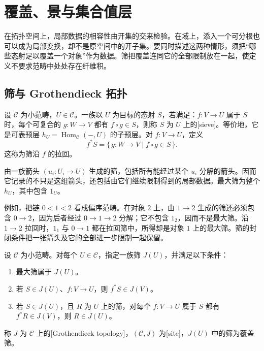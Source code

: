 
\section{覆盖、景与集合值层}
\label{b4:sec:E01}

在拓扑空间上，局部数据的相容性由开集的交来检验。在域上，添入一个可分根也可以成为局部变换，却不是原空间中的开子集。要同时描述这两种情形，须把“哪些态射足以覆盖一个对象”作为数据。筛把覆盖连同它的全部限制放在一起，使定义不要求范畴中处处存在纤维积。

\subsection{筛与 Grothendieck 拓扑}
\label{b4:subsec:E01:01}

\begin{definition}\label{b4:def:sieve}
	设 \(\mathcal C\) 为小范畴，\(U\in\mathcal C\)。一族以 \(U\) 为目标的态射 \(S\)，若满足：\(f:V\to U\) 属于 \(S\) 时，每个可复合的 \(g:W\to V\) 都有 \(f\circ g\in S\)，则称 \(S\) 为 \(U\) 上的[sieve]。等价地，它是可表预层 \(h_U=\operatorname{Hom}_{\mathcal C}(-,U)\) 的子预层。对 \(f:V\to U\)，定义
	\[
		f^*S=\{\,g:W\to V\mid f\circ g\in S\,\}.
	\]
	这称为筛沿 \(f\) 的拉回。
\end{definition}

由一族箭头 \((u_i:U_i\to U)\) 生成的筛，包括所有能经过某个 \(u_i\) 分解的箭头。因而它记录的不只是这组箭头，还包括由它们继续限制得到的局部数据。最大筛为整个 \(h_U\)，其中包含 \(1_U\)。

\ProseParagraphBreak
例如，把链 \(0<1<2\) 看成偏序范畴。在对象 \(2\) 上，由 \(1\to2\) 生成的筛还必须包含 \(0\to2\)，因为后者经过 \(0\to1\to2\) 分解；它不包含 \(1_2\)，因而不是最大筛。沿 \(1\to2\) 拉回时，\(1_1\) 与 \(0\to1\) 都在拉回筛中，所得却是对象 \(1\) 上的最大筛。筛的封闭条件把一张箭头及它的全部进一步限制一起保留。

\begin{definition}\label{b4:def:grothendieck-site}
	设 \(\mathcal C\) 为小范畴。对每个 \(U\in\mathcal C\)，指定一族筛 \(J(U)\)，并满足以下条件：
	\begin{enumerate}
		\item 最大筛属于 \(J(U)\)。
		\item 若 \(S\in J(U)\)、\(f:V\to U\)，则 \(f^*S\in J(V)\)。
		\item 若 \(S\in J(U)\)，且 \(R\) 为 \(U\) 上的筛，对每个 \(f:V\to U\) 属于 \(S\) 都有 \(f^*R\in J(V)\)，则 \(R\in J(U)\)。
	\end{enumerate}
	称 \(J\) 为 \(\mathcal C\) 上的[Grothendieck topology]，\((\mathcal C,J)\) 为[site]，\(J(U)\) 中的筛为覆盖筛。
\end{definition}

